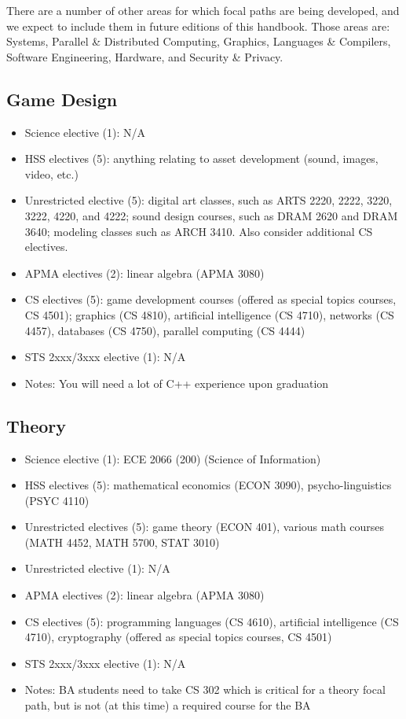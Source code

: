 \documentclass[10pt,letter]{book}
\newenvironment{itemlist}{
\begin{itemize}
\setlength{\itemsep}{0pt}
\setlength{\parskip}{0pt}}
{\end{itemize}}
\begin{document}
There are a number of other areas for which focal paths are being
developed, and we expect to include them in future editions of this
handbook. Those areas are: Systems, Parallel \& Distributed Computing,
Graphics, Languages \& Compilers, Software Engineering, Hardware, and
Security \& Privacy.


\subsection{Game Design}
\begin{itemlist}
\item Science elective (1): N/A
\item HSS electives (5): anything relating to asset development
  (sound, images, video, etc.)
\item Unrestricted elective (5): digital art classes, such as ARTS
  2220, 2222, 3220, 3222, 4220, and 4222; sound design courses, such
  as DRAM 2620 and DRAM 3640; modeling classes such as ARCH 3410.
  Also consider additional CS electives.
\item APMA electives (2): linear algebra (APMA 3080)
\item CS electives (5): game development courses (offered as special
  topics courses, CS 4501); graphics (CS 4810), artificial
  intelligence (CS 4710), networks (CS 4457), databases (CS 4750),
  parallel computing (CS 4444)
\item STS 2xxx/3xxx elective (1): N/A
\item Notes: You will need a lot of C++ experience upon graduation
\end{itemlist}

\subsection{Theory}
\begin{itemlist}
\item Science elective (1): ECE 2066 (200) (Science of Information)
\item HSS electives (5): mathematical economics (ECON 3090),
  psycho-linguistics (PSYC 4110)
\item Unrestricted electives (5): game theory (ECON 401), various math
  courses (MATH 4452, MATH 5700, STAT 3010)
\item Unrestricted elective (1): N/A
\item APMA electives (2): linear algebra (APMA 3080)
\item CS electives (5): programming languages (CS 4610), artificial
  intelligence (CS 4710), cryptography (offered as special topics
  courses, CS 4501)
\item STS 2xxx/3xxx elective (1): N/A
\item Notes: BA students need to take CS 302 which is critical for a
  theory focal path, but is not (at this time) a required course for
  the BA
\end{itemlist}
\end{document}
